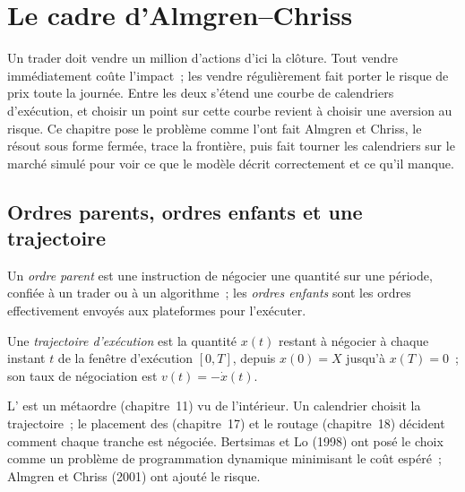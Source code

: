 \chapter{Le cadre d'Almgren--Chriss}\label{ch:mx:the-almgren-chriss-framework}

Un trader doit vendre un million d'actions d'ici la clôture. Tout vendre immédiatement coûte l'impact~; les vendre régulièrement fait porter le risque de prix toute la journée. Entre
les deux s'étend une courbe de calendriers d'exécution, et choisir un point sur cette courbe revient à choisir une aversion au risque. Ce chapitre pose le problème comme l'ont fait Almgren et Chriss,
le résout sous forme fermée, trace la frontière, puis fait tourner les calendriers sur le marché simulé pour voir ce que le modèle décrit correctement et ce qu'il manque.

\section{Ordres parents, ordres enfants et une trajectoire}

\begin{definition}\label{def:mx:the-almgren-chriss-framework:parent}
Un \emph{ordre parent} est une instruction de négocier une quantité sur une période, confiée à un trader ou à un algorithme~; les
\emph{ordres enfants} sont les ordres effectivement envoyés aux plateformes pour l'exécuter.
\end{definition}

\begin{definition}\label{def:mx:the-almgren-chriss-framework:trajectory}
Une \emph{trajectoire d'exécution} est la quantité $x(t)$ restant à négocier à chaque instant $t$ de la fenêtre d'exécution $[0,T]$, depuis
$x(0)=X$ jusqu'à $x(T)=0$~; son taux de négociation est $v(t)=-\dot x(t)$.
\end{definition}

L' est un métaordre (chapitre~11) vu de l'intérieur. Un calendrier choisit la trajectoire~; le placement des  (chapitre~17) et le routage
(chapitre~18) décident comment chaque tranche est négociée. Bertsimas et Lo (1998) ont posé le choix comme un problème de programmation dynamique minimisant le coût espéré~; Almgren et
Chriss (2001) ont ajouté le risque.

